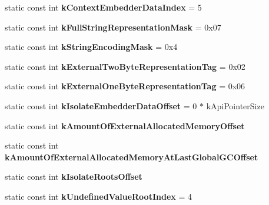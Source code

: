 \begin{DoxyCompactItemize}
\item 
static const int {\bfseries k\+Context\+Embedder\+Data\+Index} = 5\hypertarget{classv8_1_1internal_1_1_internals_afb65846499ec5f68172e4b2e8301a493}{}\label{classv8_1_1internal_1_1_internals_afb65846499ec5f68172e4b2e8301a493}

\item 
static const int {\bfseries k\+Full\+String\+Representation\+Mask} = 0x07\hypertarget{classv8_1_1internal_1_1_internals_a5c39a86b30463928ea719def66916507}{}\label{classv8_1_1internal_1_1_internals_a5c39a86b30463928ea719def66916507}

\item 
static const int {\bfseries k\+String\+Encoding\+Mask} = 0x4\hypertarget{classv8_1_1internal_1_1_internals_a1927ac3def13a57e03025e62ca46d1c5}{}\label{classv8_1_1internal_1_1_internals_a1927ac3def13a57e03025e62ca46d1c5}

\item 
static const int {\bfseries k\+External\+Two\+Byte\+Representation\+Tag} = 0x02\hypertarget{classv8_1_1internal_1_1_internals_a73faf917416d2519b65c7255e77a74ce}{}\label{classv8_1_1internal_1_1_internals_a73faf917416d2519b65c7255e77a74ce}

\item 
static const int {\bfseries k\+External\+One\+Byte\+Representation\+Tag} = 0x06\hypertarget{classv8_1_1internal_1_1_internals_ac789a0a139ccbacec0c5fb2d79427305}{}\label{classv8_1_1internal_1_1_internals_ac789a0a139ccbacec0c5fb2d79427305}

\item 
static const int {\bfseries k\+Isolate\+Embedder\+Data\+Offset} = 0 $\ast$ k\+Api\+Pointer\+Size\hypertarget{classv8_1_1internal_1_1_internals_ad722bf4760df09958cd1062db4a5524c}{}\label{classv8_1_1internal_1_1_internals_ad722bf4760df09958cd1062db4a5524c}

\item 
static const int {\bfseries k\+Amount\+Of\+External\+Allocated\+Memory\+Offset}
\item 
static const int {\bfseries k\+Amount\+Of\+External\+Allocated\+Memory\+At\+Last\+Global\+G\+C\+Offset}
\item 
static const int {\bfseries k\+Isolate\+Roots\+Offset}
\item 
static const int {\bfseries k\+Undefined\+Value\+Root\+Index} = 4\hypertarget{classv8_1_1internal_1_1_internals_a7281ff0eafed559e64613465b1a03296}{}\label{classv8_1_1internal_1_1_internals_a7281ff0eafed559e64613465b1a03296}


\end{DoxyCompactItemize}
